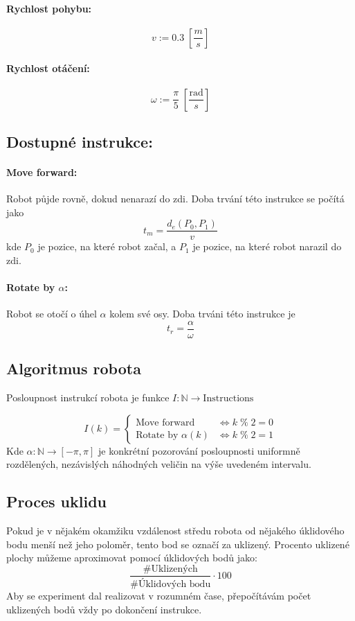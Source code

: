\documentclass[11pt]{article}
\begin{document}
\paragraph{Rychlost pohybu:}
$$
v:=0.3\; \left[\frac{m}{s}\right]
$$
\paragraph{Rychlost otáčení:}
$$
\omega := \frac{\pi}{5} \;\left[\frac{\mathrm{rad}}{s} \right]
$$

\subsection{Dostupné instrukce:}
\paragraph{Move forward:} Robot půjde rovně, dokud nenarazí do zdi. Doba trvání této instrukce se počítá jako 
$$
t_m=\frac{d_e(P_0,P_1)}{v}
$$
kde $P_0$ je pozice, na které robot začal, a $P_1$ je pozice, na které robot narazil do zdi.

\paragraph{Rotate by $\alpha$:} Robot se otočí o úhel $\alpha$ kolem své osy. Doba trváni této instrukce je
$$
t_r=\frac{\alpha}{\omega}
$$

\subsection{Algoritmus robota}
Posloupnost instrukcí robota je funkce $I:\mathbb{N}\to \mathrm{Instructions}$

$$
I(k)=
\begin{cases}
\text{Move forward} & \iff k \;\%\;2=0\\
\text{Rotate by }\alpha(k) & \iff k\;\%\;2=1
\end{cases}
$$
Kde $\alpha:\mathbb{N}\to [-\pi,\pi]$ je konkrétní pozorování posloupnosti uniformně rozdělených, nezávislých náhodných veličin na výše uvedeném intervalu. 


\subsection{Proces uklidu}
Pokud je v nějakém okamžiku vzdálenost středu robota od nějakého úklidového bodu menší než jeho poloměr, tento bod se označí za uklizený. Procento uklizené plochy můžeme aproximovat pomocí úklidových bodů jako:
$$
\frac{\#\text{Uklizených}}{\#\text{Úklidových bodu}} \cdot 100
$$
Aby se experiment dal realizovat v rozumném čase, přepočítávám počet uklizených bodů vždy po dokončení instrukce.
\end{document}
